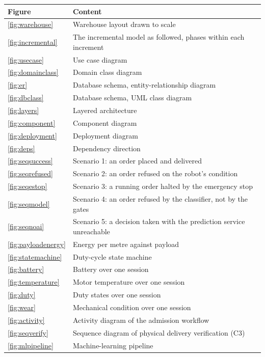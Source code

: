 \documentclass[12pt,a4paper]{report}
\begin{document}
\begin{longtable}{@{}p{}p{}@{}}
\toprule
\textbf{Figure} & \textbf{Content} \\
\midrule
\endhead
\ref{fig:warehouse} & Warehouse layout drawn to scale \\
\ref{fig:incremental} & The incremental model as followed, phases within each increment \\
\ref{fig:usecase} & Use case diagram \\
\ref{fig:domainclass} & Domain class diagram \\
\ref{fig:er} & Database schema, entity-relationship diagram \\
\ref{fig:dbclass} & Database schema, UML class diagram \\
\ref{fig:layers} & Layered architecture \\
\ref{fig:component} & Component diagram \\
\ref{fig:deployment} & Deployment diagram \\
\ref{fig:deps} & Dependency direction \\
\ref{fig:seqsuccess} & Scenario 1: an order placed and delivered \\
\ref{fig:seqrefused} & Scenario 2: an order refused on the robot's condition \\
\ref{fig:seqestop} & Scenario 3: a running order halted by the emergency stop \\
\ref{fig:seqmodel} & Scenario 4: an order refused by the classifier, not by the gates \\
\ref{fig:seqnoai} & Scenario 5: a decision taken with the prediction service unreachable \\
\ref{fig:payloadenergy} & Energy per metre against payload \\
\ref{fig:statemachine} & Duty-cycle state machine \\
\ref{fig:battery} & Battery over one session \\
\ref{fig:temperature} & Motor temperature over one session \\
\ref{fig:duty} & Duty states over one session \\
\ref{fig:wear} & Mechanical condition over one session \\
\ref{fig:activity} & Activity diagram of the admission workflow \\
\ref{fig:seqverify} & Sequence diagram of physical delivery verification (C3) \\
\ref{fig:mlpipeline} & Machine-learning pipeline \\

\end{longtable}
\end{document}
